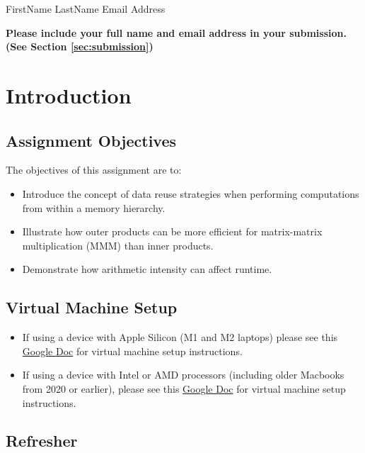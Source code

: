 \documentclass[a4 paper]{article}
\begin{document}
{ %
FirstName LastName
Email Address
}
{}{}

\begin{center}
\textbf{Please include your full name and email address in your submission.
(See Section \ref{sec:submission})
}    
\end{center}

\section*{Introduction}
\subsection*{Assignment Objectives}
The objectives of this assignment are to:
\begin{itemize}
    \item Introduce the concept of data reuse strategies when performing computations from within a memory hierarchy. 
    \item Illustrate how outer products can be more efficient for matrix-matrix multiplication (MMM) than inner products.
    \item Demonstrate how arithmetic intensity can affect runtime. 
\end{itemize}


\subsection*{Virtual Machine Setup}
\begin{itemize}
\item If using a device with Apple Silicon (M1 and M2 laptops) please see this 
\href{https://docs.google.com/document/d/1xWgQsQKmSuJR5kxzT_85huf9Bf4HRi94qkcdeuMydJw/edit}{Google Doc} 
for virtual machine setup instructions.

\item If using a device with Intel or AMD processors (including older Macbooks from 2020 or earlier), please see this
\href{https://docs.google.com/document/d/1g_JU17qZ06vynSV1yvXgBf32fLaRqTArZO213JJtejg/edit}{Google Doc}
for virtual machine setup instructions.

\end{itemize}

\subsection*{Refresher}
\end{document}
